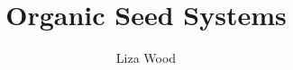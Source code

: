 \documentclass[twoside,12pt,final]{ucthesis-CA2012}
\begin{document}
\begin{ucfrontmatter}


  \title{Organic Seed Systems}
  \author{Liza Wood}

   
  \othermemberC{} %
  
	\maketitle
	
	\copyrightpage

    \begin{dedication}

      \vspace*{20ex}
      \begin{center}
      \begin{large}

        


\end{large}
\end{center}
\end{dedication}
\end{ucfrontmatter}
\end{document}
